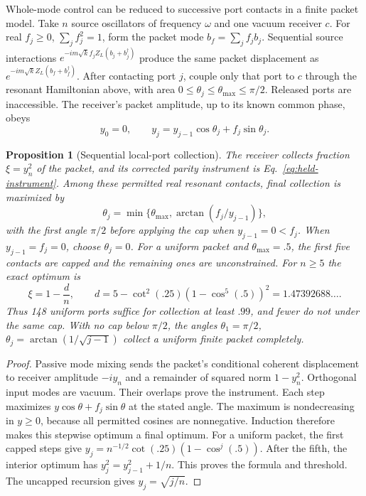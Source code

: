 \documentclass[aps,pre,onecolumn,superscriptaddress,floatfix,longbibliography]{revtex4-2}
\newtheorem{proposition}[theorem]{Proposition}
\begin{document}
Whole-mode control can be reduced to successive port contacts in a finite
packet model. Take $n$ source oscillators of frequency $\omega$ and one
vacuum receiver $c$. For real $f_j\ge0$, $\sum_jf_j^2=1$, form the packet
mode $b_f=\sum_jf_jb_j$. Sequential source interactions
$e^{-im\sqrt{k}f_jZ_L(b_j+b_j^\dagger)}$ produce the same packet displacement
as $e^{-im\sqrt{k}Z_L(b_f+b_f^\dagger)}$. After contacting port $j$, couple
only that port to $c$ through the resonant Hamiltonian above, with area
$0\le\theta_j\le\theta_{\max}\le\pi/2$. Released ports are inaccessible.
The receiver's packet amplitude, up to its known common phase, obeys
\[
 y_0=0,\qquad y_j=y_{j-1}\cos\theta_j+f_j\sin\theta_j.
\]

\begin{proposition}[Sequential local-port collection]
\label{prop:packet-collection}
The receiver collects fraction $\xi=y_n^2$ of the packet, and its corrected
parity instrument is Eq.~\eqref{eq:held-instrument}. Among these permitted
real resonant contacts, final collection is maximized by
\[
 \theta_j=\min\{\theta_{\max},\arctan(f_j/y_{j-1})\},
\]
with the first angle $\pi/2$ before applying the cap when $y_{j-1}=0<f_j$.
When $y_{j-1}=f_j=0$, choose $\theta_j=0$.
For a uniform packet and $\theta_{\max}=.5$, the first five contacts are
capped and the remaining ones are unconstrained. For $n\ge5$ the exact
optimum is
\[
 \xi=1-\frac d n,\qquad
 d=5-\cot^2(.25)(1-\cos^5(.5))^2=1.47392688\ldots.
\]
Thus 148 uniform ports suffice for collection at least $.99$, and fewer
do not under the same cap. With no cap below $\pi/2$, the angles
$\theta_1=\pi/2$, $\theta_j=\arctan(1/\sqrt{j-1})$ collect a uniform
finite packet completely.
\end{proposition}
\begin{proof}
Passive mode mixing sends the packet's conditional coherent displacement
to receiver amplitude $-i y_n$ and a remainder of squared norm $1-y_n^2$.
Orthogonal input modes are vacuum. Their overlaps prove the instrument.
Each step maximizes $y\cos\theta+f_j\sin\theta$ at the stated angle.
The maximum is nondecreasing in $y\ge0$, because all permitted cosines
are nonnegative. Induction therefore makes this stepwise optimum a final
optimum. For a uniform packet, the first capped steps give
$y_j=n^{-1/2}\cot(.25)(1-\cos^j(.5))$. After the fifth, the interior
optimum has $y_j^2=y_{j-1}^2+1/n$. This proves the formula and threshold.
The uncapped recursion gives $y_j=\sqrt{j/n}$.
\end{proof}
\end{document}

